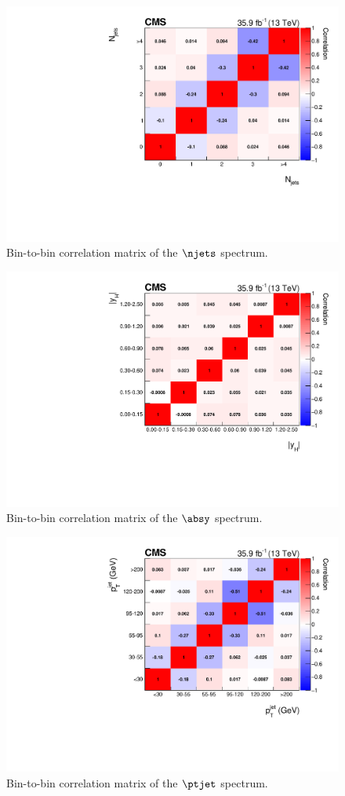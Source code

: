 \begin{figure}[hbtp]
  \begin{center}
    \includegraphics[width=0.49\linewidth]{img/differentials/appendix/corrmat_njets.pdf}
    \caption{
        Bin-to-bin correlation matrix of the $\njets$ spectrum.
        }
    \label{fig:corrMat_njets}
  \end{center}
\end{figure}

\begin{figure}[hbtp]
  \begin{center}
    \includegraphics[width=0.49\linewidth]{img/differentials/appendix/corrmat_rapidity.pdf}
    \caption{
        Bin-to-bin correlation matrix of the $\absy$ spectrum.
        }
    \label{fig:corrMat_absy}
  \end{center}
\end{figure}

\begin{figure}[hbtp]
  \begin{center}
    \includegraphics[width=0.49\linewidth]{img/differentials/appendix/corrmat_ptjet.pdf}
    \caption{
        Bin-to-bin correlation matrix of the $\ptjet$ spectrum.
        }
    \label{fig:corrMat_ptjet}
  \end{center}
\end{figure}
